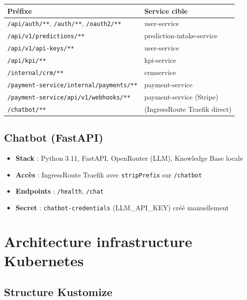 \documentclass[11pt,a4paper]{article}
\begin{document}
\begin{center}
\begin{tabular}{@{}p{6cm}p{5cm}@{}}
\toprule
\textbf{Préfixe} & \textbf{Service cible} \\
\midrule
\texttt{/api/auth/**}, \texttt{/auth/**}, \texttt{/oauth2/**} & user-service \\
\texttt{/api/v1/predictions/**} & prediction-intake-service \\
\texttt{/api/v1/api-keys/**} & user-service \\
\texttt{/api/kpi/**} & kpi-service \\
\texttt{/internal/crm/**} & crmservice \\
\texttt{/payment-service/internal/payments/**} & payment-service \\
\texttt{/payment-service/api/v1/webhooks/**} & payment-service (Stripe) \\
\texttt{/chatbot/**} & (IngressRoute Traefik direct) \\
\bottomrule
\end{tabular}
\end{center}

\subsection{Chatbot (FastAPI)}

\begin{itemize}
  \item \textbf{Stack} : Python 3.11, FastAPI, OpenRouter (LLM), Knowledge Base locale
  \item \textbf{Accès} : IngressRoute Traefik avec \texttt{stripPrefix} sur \texttt{/chatbot}
  \item \textbf{Endpoints} : \texttt{/health}, \texttt{/chat}
  \item \textbf{Secret} : \texttt{chatbot-credentials} (LLM\_API\_KEY) créé manuellement
\end{itemize}

\section{Architecture infrastructure Kubernetes}

\subsection{Structure Kustomize}
\end{document}
